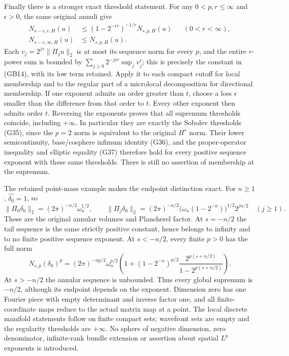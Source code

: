 \documentclass[
  11pt,
]{article}
\begin{document}
Finally there is a stronger exact threshold statement. For any
\(0<p,r\le\infty\) and \(\epsilon>0\), the same original annuli give \[
 \begin{aligned}
 N_{s-\epsilon,r,H}(u)&\le
       (1-2^{-\epsilon r})^{-1/r}N_{s,p,H}(u)
                                  &&(0<r<\infty),\\
 N_{s-\epsilon,\infty,H}(u)&\le N_{s,p,H}(u).
 \end{aligned}
 \tag{GB14}
\] Each \(v_j=2^{js}\|\Pi_j u\|_2\) is at most its sequence norm for
every \(p\), and the entire \(r\)-power sum is bounded by
\(\sum_{j\ge0}2^{-j\epsilon r}\sup_jv_j^r\); this is precisely the
constant in (GB14), with its low term retained. Apply it to each compact
cutoff for local membership and to the regular part of a microlocal
decomposition for directional membership. If one exponent admits an
order greater than \(t\), choose a loss \(\epsilon\) smaller than the
difference from that order to \(t\). Every other exponent then admits
order \(t\). Reversing the exponents proves that all supremum thresholds
coincide, including \(+\infty\). In particular they are exactly the
Sobolev thresholds (G35), since the \(p=2\) norm is equivalent to the
original \(H^s\) norm. Their lower semicontinuity, base/cosphere infimum
identity (G36), and the proper-operator inequality and elliptic equality
(G37) therefore hold for every positive sequence exponent with these
same thresholds. There is still no assertion of membership at the
supremum.

The retained point-mass example makes the endpoint distinction exact.
For \(n\ge1\), \(\widehat{\delta_0}=1\), so \[
 \|\Pi_0\delta_0\|_2=(2\pi)^{-n/2}\omega_n^{1/2},\qquad
 \|\Pi_j\delta_0\|_2=(2\pi)^{-n/2}
       \bigl(\omega_n(1-2^{-n})\bigr)^{1/2}2^{jn/2}
       \quad(j\ge1).
 \tag{GB15}
\] These are the original annular volumes and Plancherel factor. At
\(s=-n/2\) the tail sequence is the same strictly positive constant,
hence belongs to infinity and to no finite positive sequence exponent.
At \(s<-n/2\), every finite \(p>0\) has the full norm \[
 N_{s,p}(\delta_0)^p=(2\pi)^{-np/2}\omega_n^{p/2}
 \left(1+(1-2^{-n})^{p/2}
       \frac{2^{p(s+n/2)}}{1-2^{p(s+n/2)}}\right).
 \tag{GB16}
\] At \(s>-n/2\) the annular sequence is unbounded. Thus every global
supremum is \(-n/2\), although its endpoint depends on the exponent.
Dimension zero has one Fourier piece with empty determinant and inverse
factor one, and all finite-coordinate maps reduce to the actual matrix
map at a point. The local discrete manifold statements follow on finite
compact sets; wavefront sets are empty and the regularity thresholds are
\(+\infty\). No sphere of negative dimension, zero denominator,
infinite-rank bundle extension or assertion about spatial \(L^p\)
exponents is introduced.
\end{document}
